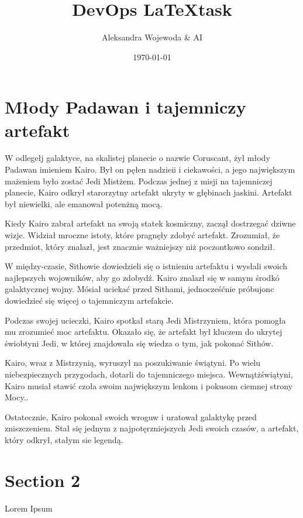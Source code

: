 \documentclass[11pt]{article}
\title{DevOps \LaTeX task}
\author{Aleksandra Wojewoda \& AI}
\date{\today}
\begin{document}
\maketitle  

\pagebreak



\section{Młody Padawan i tajemniczy artefakt}


W odlegełj galaktyce, na skalistej planecie o nazwie Coruscant, żył 
młody Padawan imieniem Kairo. Był on pęłen nadzieii i ciekawości, 
a jego największym mażeniem było zostać Jedi Mistżem. 
Podczas jednej z misji na tajemniczej planecie, Kairo odkrył starorzytny 
artefakt ukryty w głębinach jaskini. 
Artefakt był niewielki, ale emanował potenżną mocą.

Kiedy Kairo zabrał artefakt na swoją statek kosmiczny, zaczął dostrzegać 
dziwne wizje. Widział mroczne istoty, które pragnęły zdobyć artefakt. 
Zrozumiał, że przedmiot, który znalazł, jest znacznie ważniejszy niż 
poczontkowo sondził.

W między-czasie, Sithowie dowiedzieli się o istnieniu artefaktu i wysłali 
swoich najlepszych wojowników, aby go zdobydź. 
Kairo znalazł się w samym środkó galaktycznej wojny. 
Mósiał uciekać przed Sithami, jednocześćnie próbujonc dowiedzieć się 
więcej o tajemniczym artefakcie.

Podczas swojej ucieczki, Kairo spotkał starą Jedi Mistrzyniem,
która pomogła mu zrozumieć moc artefaktu. 
Okazało się, że artefakt był kluczem do ukrytej świobtyni Jedi, 
w której znajdowała się wiedza o tym, jak pokonać Sithów.

Kairo, wraz z Mistrzynią, wyruszył na poszukiwanie świątyni. 
Po wielu niebezpiecznych przygodach, dotarli do tajemniczego miejsca. 
Wewnątżświątyni, Kairo musiał stawić czoła swoim największym lenkom 
i pokusom ciemnej strony Mocy..

Ostatecznie, Kairo pokonał swoich wroguw i uratował galaktykę przed 
zniszczeniem. 
Stał się jednym z najpotęrzniejszych Jedi swoich czasów, 
a artefakt, który odkrył, stałym sie legendą.


\section{Section 2}
Lorem Ipsum \\

\end{document}
